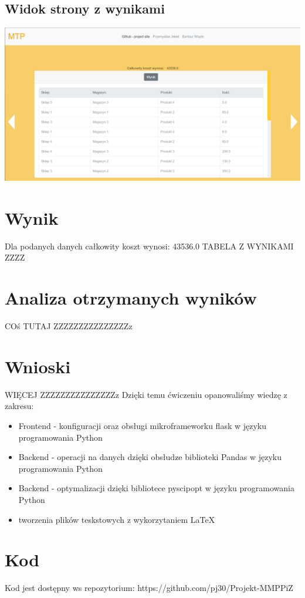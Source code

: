 \documentclass[11pt]{article}
\begin{document}
\subsection{Widok strony z wynikami}
\includegraphics[width=\textwidth,height=\textheight,keepaspectratio]{2.png}
\section{Wynik}
Dla podanych danych całkowity koszt wynosi:   43536.0
TABELA Z WYNIKAMI ZZZZ
\section{Analiza otrzymanych wyników}
COś TUTAJ ZZZZZZZZZZZZZZZz
\section{Wnioski}
WIĘCEJ ZZZZZZZZZZZZZZZz 
Dzięki temu ćwiczeniu opanowaliśmy wiedzę z zakresu:
\begin{itemize}
	\item Frontend - konfiguracji oraz obsługi mikroframeworku flask w języku programowania Python
	\item Backend - operacji na danych dzięki obsłudze biblioteki Pandas w języku programowania Python
	\item Backend - optymalizacji dzięki bibliotece pyscipopt w języku programowania Python
	\item tworzenia plików teskstowych z wykorzytaniem LaTeX 
\end{itemize}

\newpage 

\section{Kod}
Kod jest dostępny ws repozytorium: 
https://github.com/pj30/Projekt-MMPPiZ
\end{document}
